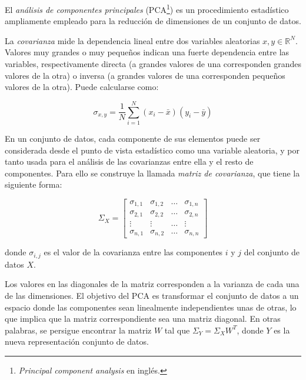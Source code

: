 El \textit{análisis de componentes principales} (PCA\footnote{\textit{Principal component analysis} en inglés.}) es un procedimiento estadístico ampliamente empleado para la reducción de dimensiones de un conjunto de datos.

La \textit{covarianza} mide la dependencia lineal entre dos variables aleatorias $x,y\in \mathbb{R}^N$.
Valores muy grandes o muy pequeños indican una fuerte dependencia entre las variables, respectivamente directa (a grandes valores de una corresponden grandes valores de la otra) o inversa (a grandes valores de una corresponden pequeños valores de la otra).
Puede calcularse como:

\begin{equation}
    \label{eq:covariance}
    \sigma_{x,y} = \frac{1}{N}\sum_{i=1}^{N}{(x_i - \bar{x})(y_i - \bar{y})}
\end{equation}

En un conjunto de datos, cada componente de sus elementos puede ser considerada desde el punto de vista estadístico como una variable aleatoria, y por tanto usada para el análisis de las covarianzas entre ella y el resto de componentes.
Para ello se construye la llamada \textit{matriz de covarianza}, que tiene la siguiente forma:

\begin{equation}
    \label{eq:covariance-matrix}
    \Sigma_X = \begin{bmatrix}
                   \sigma_{1,1} & \sigma_{1,2} & \ldots & \sigma_{1,n} \\
                   \sigma_{2,1} & \sigma_{2,2} & \ldots & \sigma_{2,n} \\
                   \vdots & \vdots & \ldots & \vdots \\
                   \sigma_{n,1} & \sigma_{n,2} & \ldots & \sigma_{n,n}
    \end{bmatrix}
\end{equation}

\noindent
donde $\sigma_{i,j}$ es el valor de la covarianza entre las componentes $i$ y $j$ del conjunto de datos $X$.

Los valores en las diagonales de la matriz corresponden a la varianza de cada una de las dimensiones.
El objetivo del PCA es transformar el conjunto de datos a un espacio donde las componentes sean linealmente independientes unas de otras, lo que implica que la matriz correspondiente sea una matriz diagonal.
En otras palabras, se persigue encontrar la matriz $W$ tal que $\Sigma_Y = \Sigma_X W^T$, donde $Y$ es la nueva representación conjunto de datos.

